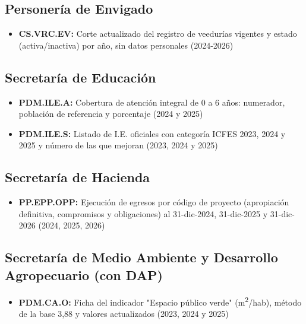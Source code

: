 \documentclass[11pt,letterpaper]{article}
\begin{document}
\subsection*{Personería de Envigado}

\begin{itemize}

\item \textbf{CS.VRC.EV:} Corte actualizado del registro de veedurías vigentes y estado (activa/inactiva) por año, sin datos personales (2024-2026)

\end{itemize}

\subsection*{Secretaría de Educación}

\begin{itemize}

\item \textbf{PDM.ILE.A:} Cobertura de atención integral de 0 a 6 años: numerador, población de referencia y porcentaje (2024 y 2025)

\item \textbf{PDM.ILE.S:} Listado de I.E. oficiales con categoría ICFES 2023, 2024 y 2025 y número de las que mejoran (2023, 2024 y 2025)

\end{itemize}

\subsection*{Secretaría de Hacienda}

\begin{itemize}

\item \textbf{PP.EPP.OPP:} Ejecución de egresos por código de proyecto (apropiación definitiva, compromisos y obligaciones) al 31-dic-2024, 31-dic-2025 y 31-dic-2026 (2024, 2025, 2026)

\end{itemize}

\subsection*{Secretaría de Medio Ambiente y Desarrollo Agropecuario (con DAP)}

\begin{itemize}

\item \textbf{PDM.CA.O:} Ficha del indicador "Espacio público verde" (m\textsuperscript{2}/hab), método de la base 3,88 y valores actualizados (2023, 2024 y 2025)

\end{itemize}
\end{document}
